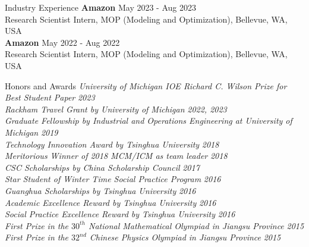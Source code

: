 \documentclass{resume}
\begin{document}
\begin{rSection}{Industry Experience}
 {\bf Amazon} \hfill {May 2023 - Aug 2023}\\
 {Research Scientist Intern, MOP (Modeling and Optimization), Bellevue, WA, USA}\\
 {\bf Amazon} \hfill {May 2022 - Aug 2022}\\
 {Research Scientist Intern, MOP (Modeling and Optimization), Bellevue, WA, USA}
\end{rSection}

\begin{rSection}{Honors and Awards} 
{\em University of Michigan IOE Richard C. Wilson Prize for Best Student Paper} \hfill {\em 2023}\\
{\em Rackham Travel Grant by University of Michigan} \hfill {\em 2022, 2023}\\
{\em Graduate Fellowship by Industrial and Operations Engineering at University of Michigan} \hfill {\em 2019}\\
 {\em Technology Innovation Award by Tsinghua University} \hfill {\em 2018}\\
 {\em Meritorious Winner of 2018 MCM/ICM as team leader} \hfill {\em 2018}\\
 {\em CSC Scholarships by China Scholarship Council} \hfill {\em 2017}\\
 {\em Star Student of Winter Time Social Practice Program} \hfill {\em 2016}\\
 {\em Guanghua Scholarships by Tsinghua University} \hfill {\em 2016}\\
 {\em Academic Excellence Reward by Tsinghua University} \hfill {\em 2016}\\
 {\em Social Practice Excellence Reward by Tsinghua University} \hfill {\em 2016}\\
 {\em First Prize in the $30^{th}$ National Mathematical Olympiad in Jiangsu Province} \hfill {\em 2015}\\
 {\em First Prize in the $32^{nd}$ Chinese Physics Olympiad in Jiangsu Province} \hfill {\em 2015}
\end{rSection}
\end{document}
